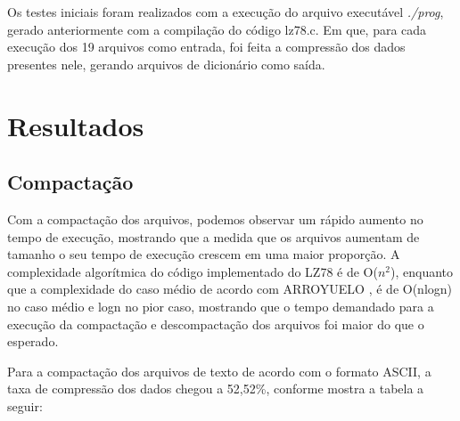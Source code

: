 \documentclass[
	article,			
	11pt,				
	oneside,			
	a4paper,			
	english,			
	brazil,				
	sumario=tradicional
	]{abntex2}
\begin{document}
Os testes iniciais foram realizados com a execução do arquivo executável \textit{./prog}, gerado anteriormente com a compilação do código lz78.c. Em que, para cada execução dos 19 arquivos como entrada, foi feita a compressão dos dados presentes nele, gerando arquivos de dicionário como saída.

\section{Resultados}
\subsection{Compactação}
Com a compactação dos arquivos, podemos observar um rápido aumento no tempo de execução, mostrando que a medida que os arquivos aumentam de tamanho o seu tempo de execução crescem em uma maior proporção. A complexidade algorítmica do código implementado do LZ78 é de O($n^2$), enquanto que a complexidade do caso médio de acordo com ARROYUELO \cite{arroyueloetal2017}, é de O(nlogn) no caso médio e logn no pior caso, mostrando que o tempo demandado para a execução da compactação e descompactação dos arquivos foi maior do que o esperado. 

Para a compactação dos arquivos de texto de acordo com o formato ASCII, a taxa de compressão dos dados chegou a 52,52\%, conforme mostra a tabela a seguir:
\end{document}

